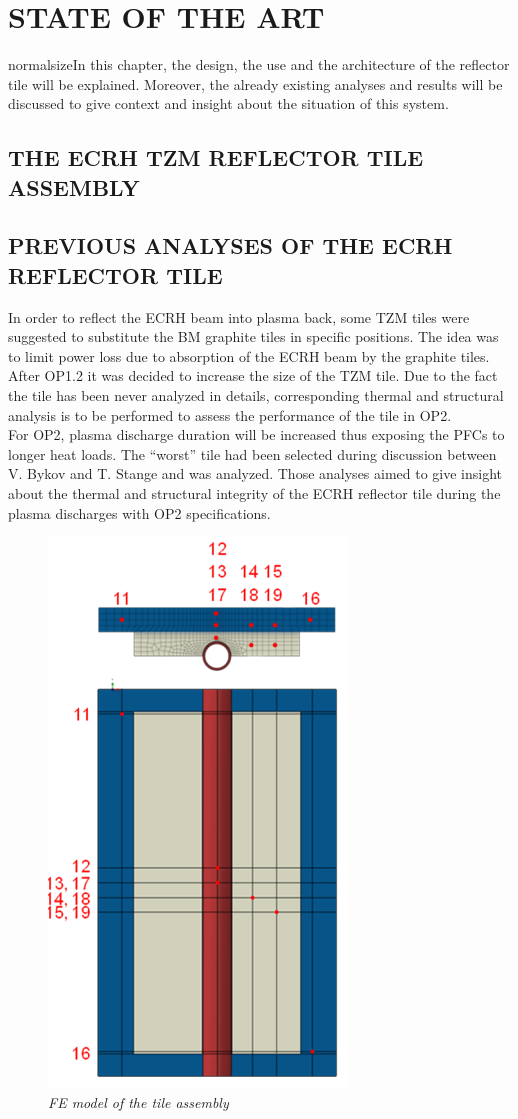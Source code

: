 \chapter{STATE OF THE ART}
normalsize{In this chapter, the design, the use and the architecture of the reflector tile will be explained. Moreover, the already existing analyses and results will be discussed to give context and insight about the situation of this system.}
\section{THE \acrshort{ECRH} \acrshort{TZM} REFLECTOR TILE ASSEMBLY}
\section{PREVIOUS ANALYSES OF THE ECRH REFLECTOR TILE}
\normalsize{In order to reflect the \acrshort{ECRH} beam into plasma back, some \acrshort{TZM} tiles were suggested to substitute the \acrshort{BM} graphite tiles in specific positions. The idea was to limit power loss due to absorption of the \acrshort{ECRH} beam by the graphite tiles. After \acrshort{OP1}.2 it was decided to increase the size of the \acrshort{TZM} tile. Due to the fact the tile has been never analyzed in details, corresponding thermal and structural analysis is to be performed to assess the performance of the tile in \acrshort{OP2}.}
\\
\break
\normalsize{\indent For \acrshort{OP2}, plasma discharge duration will be increased thus exposing the \acrshort{PFCs} to longer heat loads. The “worst” tile had been selected during discussion between V. Bykov and T. Stange and was analyzed. Those analyses aimed to give insight about the thermal and structural integrity of the \acrshort{ECRH} reflector tile during the plasma discharges with \acrshort{OP2} specifications.}
\\
\begin{figure}[h!]
    \centering
    \includegraphics[width=.45\textwidth]{figures/JFellingerFEModel.png}
    \caption{\it FE model of the tile assembly \cite{Fellinger_2013}}
    \label{fig:fig_3_1}
\end{figure}
